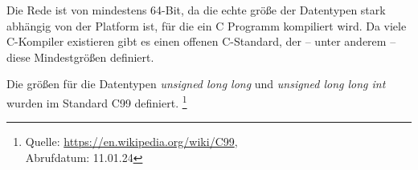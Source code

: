 \documentclass[twocolumn]{report}
\begin{document}
Die Rede ist von mindestens 64-Bit,
da die echte größe der Datentypen stark abhängig von der
Platform ist, für die ein C Programm kompiliert wird.
Da viele C-Kompiler existieren gibt es einen offenen C-Standard,
der -- unter anderem -- diese Mindestgrößen definiert.

Die größen für die Datentypen \textit{unsigned long long} und
\textit{unsigned long long int} wurden im Standard C99 definiert.
\footnote{Quelle: \url{https://en.wikipedia.org/wiki/C99},\\
Abrufdatum: 11.01.24}
\end{document}
